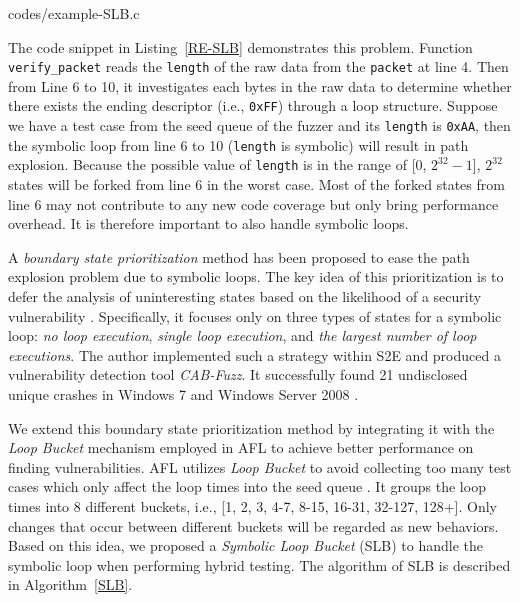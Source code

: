
{codes/example-SLB.c} 

The code snippet in Listing~\ref{RE-SLB} demonstrates this problem. 
Function \texttt{verify\_packet} reads the \texttt{length} of the 
raw data from the \texttt{packet} at line 4.
 Then from Line 6 to 10, it investigates each bytes in the raw data 
 to determine whether there exists the ending descriptor 
 (i.e., \texttt{0xFF}) through a loop structure. 
 Suppose we have a test case from the seed queue of 
 the fuzzer and its \texttt{length} is \texttt{0xAA}, 
 then the symbolic loop 
 from line 6 to 10 (\texttt{length} is symbolic) 
 will result in path explosion.
 Because the possible value of \texttt{length} is in the 
 range of [0, $2^{32}-1$], $2^{32}$ states will be forked from 
 line 6 in the worst case. 
Most of the forked states from line 6 may not contribute 
to any new code coverage but only bring performance overhead.
It is therefore important to also handle symbolic loops. 

A \textit{boundary state prioritization} method has been proposed 
to ease the path explosion problem due to symbolic loops.
The key idea of this prioritization is to defer the analysis of 
uninteresting states based on the likelihood of a security vulnerability \cite{cab-fuzz}. 
Specifically, it focuses only on three types of states for a symbolic 
loop: \textit{no loop execution}, \textit{single loop execution}, and 
\textit{the largest number of loop executions}.
The author implemented such a strategy within S2E \cite{chipounov2011s2e} 
and produced a vulnerability detection tool \textit{CAB-Fuzz}.
It successfully found 21 undisclosed unique crashes in Windows 7 and 
Windows Server 2008 \cite{cab-fuzz}.
 
We extend this boundary state prioritization method by integrating it 
with the \emph{Loop Bucket} mechanism employed in AFL \cite{online:afl} 
to achieve better performance on finding vulnerabilities.
AFL utilizes \emph{Loop Bucket} to avoid collecting too many test cases 
which only affect the loop times into the seed queue \cite{online:afl}. 
It groups the loop times into 8 different buckets, i.e., 
[1, 2, 3, 4-7, 8-15, 16-31, 32-127, 128+]. Only changes that occur 
between different buckets will be regarded as new behaviors. 
Based on this idea, we proposed a \textit{Symbolic Loop Bucket} (SLB) 
to handle the symbolic loop when performing hybrid testing. The 
algorithm of SLB is described in Algorithm~\ref{SLB}.

